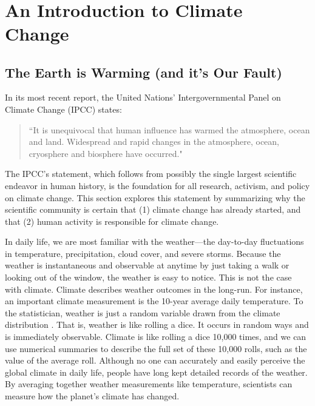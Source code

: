 ~
\newpage
\section{An Introduction to Climate Change}

\subsection{The Earth is Warming (and it's Our Fault)}

In its most recent report, the United Nations' Intergovernmental Panel on Climate Change (IPCC) states:
\begin{quote}
``It is unequivocal that human influence has warmed the atmosphere, ocean and land. Widespread and rapid changes in the atmosphere, ocean, cryosphere and biosphere have occurred." \citep{ipcc1_summary}
\end{quote}
The IPCC's statement, which follows from possibly the single largest scientific endeavor in human history, is the foundation for all research, activism, and policy on climate change. This section explores this statement by summarizing why the scientific community is certain that (1) climate change has already started, and that (2) human activity is responsible for climate change. 

In daily life, we are most familiar with the weather---the day-to-day fluctuations in temperature, precipitation, cloud cover, and severe storms. Because the weather is instantaneous and observable at anytime by just taking a walk or looking out of the window, the weather is easy to notice. This is not the case with climate. Climate describes weather outcomes in the long-run. For instance, an important climate measurement is the 10-year average daily temperature. To the statistician, weather is just a random variable drawn from the climate distribution \citep{auffhammer2018quantifying}. That is, weather is like rolling a dice. It occurs in random ways and is immediately observable. Climate is like rolling a dice 10,000 times, and we can use numerical summaries to describe the full set of these 10,000 rolls, such as the value of the average roll. Although no one can accurately and easily perceive the global climate in daily life, people have long kept detailed records of the weather. By averaging together weather measurements like temperature, scientists can measure how the planet's climate has changed. 

